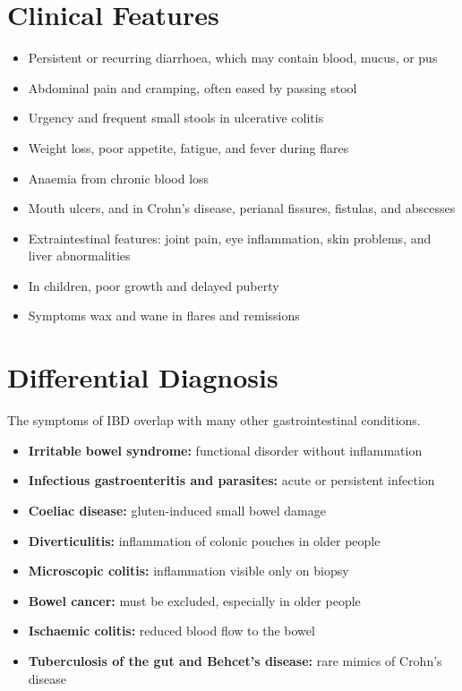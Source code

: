 \section*{Clinical Features}
\begin{itemize}
    \item Persistent or recurring diarrhoea, which may contain blood, mucus, or pus
    \item Abdominal pain and cramping, often eased by passing stool
    \item Urgency and frequent small stools in ulcerative colitis
    \item Weight loss, poor appetite, fatigue, and fever during flares
    \item Anaemia from chronic blood loss
    \item Mouth ulcers, and in Crohn's disease, perianal fissures, fistulas, and abscesses
    \item Extraintestinal features: joint pain, eye inflammation, skin problems, and liver abnormalities
    \item In children, poor growth and delayed puberty
    \item Symptoms wax and wane in flares and remissions
\end{itemize}

\section*{Differential Diagnosis}
The symptoms of IBD overlap with many other gastrointestinal conditions.
\begin{itemize}
    \item \textbf{Irritable bowel syndrome:} functional disorder without inflammation
    \item \textbf{Infectious gastroenteritis and parasites:} acute or persistent infection
    \item \textbf{Coeliac disease:} gluten-induced small bowel damage
    \item \textbf{Diverticulitis:} inflammation of colonic pouches in older people
    \item \textbf{Microscopic colitis:} inflammation visible only on biopsy
    \item \textbf{Bowel cancer:} must be excluded, especially in older people
    \item \textbf{Ischaemic colitis:} reduced blood flow to the bowel
    \item \textbf{Tuberculosis of the gut and Behcet's disease:} rare mimics of Crohn's disease
\end{itemize}

